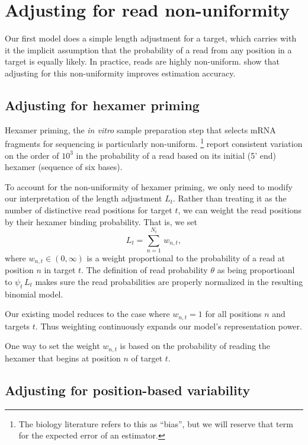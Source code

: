\documentclass[11pt]{report}
\begin{document}
\section{Adjusting for read non-uniformity}

Our first model does a simple length adjustment for a target, which
carries with it the implicit assumption that the probability of a read
from any position in a target is equally likely.  In practice, reads
are highly non-uniform.  \cite{roberts2011improving} show that
adjusting for this non-uniformity improves estimation accuracy.

\subsection{Adjusting for hexamer priming}

Hexamer priming, the \textit{in vitro} sample preparation step that
selects mRNA fragments for sequencing is particularly non-uniform.%
\footnote{The biology literature refers to this as ``bias'', but we
  will reserve that term for the expected error of an estimator.}
\cite{hansen2010biases} report consistent variation on the order of
$10^3$ in the probability of a read based on its initial (5' end)
hexamer (sequence of six bases).

To account for the non-uniformity of hexamer priming, we only need to
modify our interpretation of the length adjustment $L_t$.
Rather than treating it as the number of distinctive read positions
for target $t$, we can weight the read positions by their hexamer
binding probability.  That is, we set
\[
  L_t = \sum_{n = 1}^{N_t} \, w_{n,t},
\]
where $w_{n,t} \in (0, \infty)$ is a weight proportional to the
probability of a read at position $n$ in target $t$.  The definition
of read probability $\theta$ as being proportioanl to $\psi_t \, L_t$
makes sure the read probabilities are properly normalized in the
resulting binomial model.

Our existing model reduces to the case where $w_{n,t} = 1$ for all
positions $n$ and targets $t$.  Thus weighting continuously expands
our model's representation power.

One way to set the weight $w_{n,t}$ is based on the probability of
reading  the hexamer that begins at position $n$ of target $t$.

\subsection{Adjusting for position-based variability}
\end{document}
